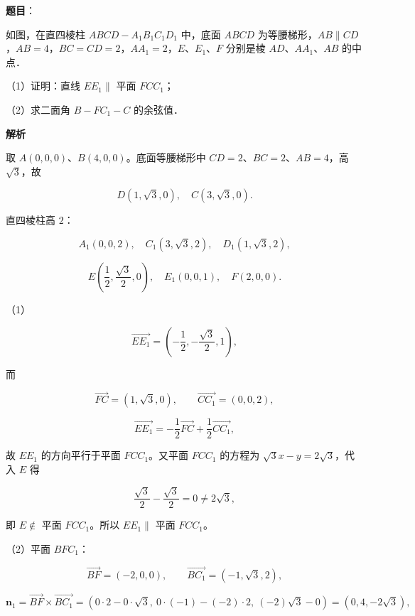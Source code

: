 \begin{answer}

\textbf{题目}：

如图，在直四棱柱 $ABCD-A_1B_1C_1D_1$ 中，底面 $ABCD$ 为等腰梯形，$AB\parallel CD$，$AB=4$，$BC=CD=2$，$AA_1=2$，$E$、$E_1$、$F$ 分别是棱 $AD$、$AA_1$、$AB$ 的中点．
\nopagebreak[4]
\begin{center}\end{center}
\nopagebreak[4]
（1）证明：直线 $EE_1\parallel$ 平面 $FCC_1$；

（2）求二面角 $B-FC_1-C$ 的余弦值．

\textbf{解析}

取 $A(0,0,0)$、$B(4,0,0)$。底面等腰梯形中 $CD=2$、$BC=2$、$AB=4$，高 $\sqrt3$，故

\nopagebreak[4]
\[D(1,\sqrt3,0),\quad C(3,\sqrt3,0).\]

直四棱柱高 $2$：

\nopagebreak[4]
\[A_1(0,0,2),\quad C_1(3,\sqrt3,2),\quad D_1(1,\sqrt3,2),\]

\nopagebreak[4]
\[E\left(\frac12,\frac{\sqrt3}{2},0\right),\quad E_1(0,0,1),\quad F(2,0,0).\]

（1）

\nopagebreak[4]
\[\overrightarrow{EE_1}=\left(-\frac12,-\frac{\sqrt3}{2},1\right),\]

而

\nopagebreak[4]
\[\overrightarrow{FC}=(1,\sqrt3,0),\qquad \overrightarrow{CC_1}=(0,0,2),\]

\nopagebreak[4]
\[\overrightarrow{EE_1}=-\frac12\overrightarrow{FC}+\frac12\overrightarrow{CC_1},\]

故 $EE_1$ 的方向平行于平面 $FCC_1$。又平面 $FCC_1$ 的方程为 $\sqrt3x-y=2\sqrt3$，代入 $E$ 得

\nopagebreak[4]
\[\frac{\sqrt3}{2}-\frac{\sqrt3}{2}=0\neq2\sqrt3,\]

即 $E\notin$ 平面 $FCC_1$。所以 $EE_1\parallel$ 平面 $FCC_1$。

（2）平面 $BFC_1$：

\nopagebreak[4]
\[\overrightarrow{BF}=(-2,0,0),\qquad \overrightarrow{BC_1}=(-1,\sqrt3,2),\]

\nopagebreak[4]
\[\boldsymbol n_1=\overrightarrow{BF}\times\overrightarrow{BC_1}
=(0\cdot2-0\cdot\sqrt3,\ 0\cdot(-1)-(-2)\cdot2,\ (-2)\sqrt3-0)=(0,4,-2\sqrt3),\]


\end{answer}
